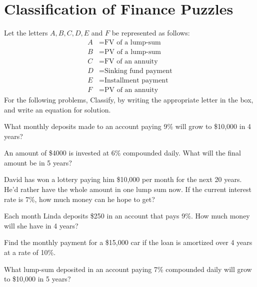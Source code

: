 \section{Classification of Finance Puzzles}

Let the letters \( A, B, C, D, E \) and \( F \) be represented as follows:
\begin{align*}
    A & = \text{FV of a lump-sum}     \\
    B & = \text{PV of a lump-sum}     \\
    C & = \text{FV of an annuity}     \\
    D & = \text{Sinking fund payment} \\
    E & = \text{Installment payment}  \\
    F & = \text{PV of an annuity}
\end{align*}
For the following problems, Classify, by writing the appropriate letter in the box, and write an equation for solution.

\begin{puzzle}
    What monthly deposits made to an account paying 9\% will grow to \$10,000 in 4 years?
\end{puzzle}

\begin{puzzle}
    An amount of \$4000 is invested at 6\% compounded daily. What will the final amount be in 5 years?
\end{puzzle}

\begin{puzzle}
    David has won a lottery paying him \$10,000 per month for the next 20 years. He'd rather have the whole amount in one lump sum now. If the current interest rate is 7\%, how much money can he hope to get?
\end{puzzle}

\begin{puzzle}
    Each month Linda deposits \$250 in an account that pays 9\%. How much money will she have in 4 years?
\end{puzzle}

\begin{puzzle}
    Find the monthly payment for a \$15,000 car if the loan is amortized over 4 years at a rate of 10\%.
\end{puzzle}

\begin{puzzle}
    What lump-sum deposited in an account paying 7\% compounded daily will grow to \$10,000 in 5 years?
\end{puzzle}

